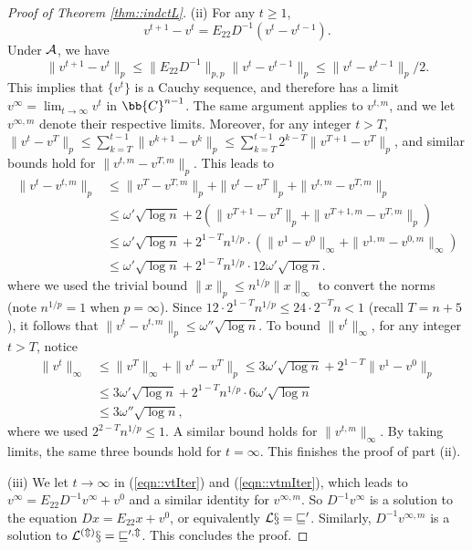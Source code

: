 \documentclass[12pt]{article}%
\theoremstyle{plain}%
\theoremstyle{remark}
\begin{document}
\begin{proof}[Proof of Theorem \ref{thm::indctL}]
(ii) For any $t \ge 1$, 
\begin{equation*}
v^{t+1} - v^t = E_{22} D^{-1} (v^t - v^{t-1}).
\end{equation*}
Under $\cal{A}$, we have
\begin{equation*}
\| v^{t+1} - v^t \|_p \le \| E_{22} D^{-1} \|_{p,p} \| v^t - v^{t-1} \|_p \le  \| v^t - v^{t-1} \|_p /2.
\end{equation*}
This implies that $\{v^t\}$ is a Cauchy sequence, and therefore has a limit $v^{\infty} = \lim_{t \to \infty} v^t$ in $\bb{C}^{n-1}$. The same argument applies to $v^{t,m}$, and we let $v^{\infty, m}$ denote their respective limits. Moreover, for any integer $t > T$, $\| v^{t} - v^T \|_p \le \sum_{k=T}^{t-1} \| v^{k+1} - v^k \|_p \le \sum_{k=T}^{t-1} 2^{k-T} \| v^{T+1} - v^T \|_p$, and similar bounds hold for $ \| v^{t,m} - v^{T,m} \|_p$. This leads to
\begin{align*}
\| v^t - v^{t,m} \|_{p} &\le \| v^T - v^{T,m} \|_{p} + \| v^{t} - v^T \|_p + \| v^{t,m} - v^{T,m} \|_p \\
&\le \omega' \sqrt{\log n} + 2 ( \| v^{T+1} - v^T \|_p + \| v^{T+1,m} - v^{T,m} \|_p) \\
&\le \omega' \sqrt{\log n} + 2^{1-T}n^{1/p} \cdot ( \| v^{1} - v^0 \|_\infty + \| v^{1,m} - v^{0,m} \|_\infty ) \\
&\le \omega' \sqrt{\log n} + 2^{1-T}n^{1/p} \cdot 12\omega'  \sqrt{\log n}.
\end{align*}
where we used the trivial bound $\| x \|_p \le n^{1/p} \|x \|_{\infty}$ to convert the norms (note $n^{1/p}=1$ when $p=\infty$). Since $12 \cdot 2^{1-T} n^{1/p} \le 24 \cdot 2^{-T} n < 1$ (recall $T = n+5$), it follows that $\| v^t - v^{t,m} \|_{p} \le \omega'' \sqrt{\log n}$. To bound $\| v^t \|_{\infty}$, for any integer $t > T$, notice
\begin{align*}
\| v^t \|_\infty &\le \| v^T \|_\infty + \| v^t - v^T \|_p \le 3\omega'\sqrt{\log n} + 2^{1-T} \|v^1 - v^0\|_p \\
&\le 3\omega'\sqrt{\log n} + 2^{1-T} n^{1/p} \cdot 6\omega' \sqrt{\log n} \\
&\le 3\omega'' \sqrt{\log n},
\end{align*}
where we used $2^{2-T}n^{1/p} \le 1$. A similar bound holds for $\| v^{t,m} \|_\infty$. By taking limits, the same three bounds hold for $t = \infty$. This finishes the proof of part (ii).

(iii) We let $t \to \infty$ in (\ref{eqn::vtIter}) and (\ref{eqn::vtmIter}), which leads to $v^{\infty} = E_{22} D^{-1} v^{\infty} + v^0$ and a similar identity for $v^{\infty, m}$. So $D^{-1}v^\infty$ is a solution to the equation $Dx = E_{22}x + v^0$, or equivalently $\cal{L}x = v^0$. Similarly, $D^{-1}v^{\infty,m}$ is a solution to $\cal{L}^{(m)}x = v^{0,m}$. This concludes the proof.
\end{proof}
\end{document}
